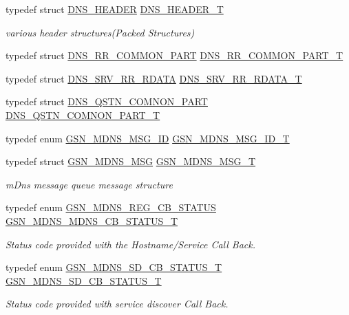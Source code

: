 \begin{DoxyCompactItemize}
\item 
typedef struct \hyperlink{a00013}{DNS\_\-HEADER} \hyperlink{a00668_gaf26129a48ef3757ef5060ba8bb457d9c}{DNS\_\-HEADER\_\-T}
\begin{DoxyCompactList}\small\item\em various header structures(Packed Structures) \end{DoxyCompactList}\item 
typedef struct \hyperlink{a00015}{DNS\_\-RR\_\-COMMON\_\-PART} \hyperlink{a00526_a7a61e300572a2dbc5c7694b9975e977f}{DNS\_\-RR\_\-COMMON\_\-PART\_\-T}
\item 
typedef struct \hyperlink{a00016}{DNS\_\-SRV\_\-RR\_\-RDATA} \hyperlink{a00526_a5a120225d78963b53675c5e27686c7ab}{DNS\_\-SRV\_\-RR\_\-RDATA\_\-T}
\item 
typedef struct \hyperlink{a00014}{DNS\_\-QSTN\_\-COMNON\_\-PART} \hyperlink{a00526_a8ac066089aff8c4b88aeb4dca6500e7d}{DNS\_\-QSTN\_\-COMNON\_\-PART\_\-T}
\item 
typedef enum \hyperlink{a00526_aea0edb0e612a2715e8e8b67018db1936}{GSN\_\-MDNS\_\-MSG\_\-ID} \hyperlink{a00526_a04683c3770745c022dfa21c6317456a9}{GSN\_\-MDNS\_\-MSG\_\-ID\_\-T}
\item 
typedef struct \hyperlink{a00145}{GSN\_\-MDNS\_\-MSG} \hyperlink{a00668_ga3216bbc2adc29e835ce14e76c1e80d44}{GSN\_\-MDNS\_\-MSG\_\-T}
\begin{DoxyCompactList}\small\item\em mDns message queue message structure \end{DoxyCompactList}\item 
typedef enum \hyperlink{a00668_ga4736a957266d4e3ba37c9d5ec86beec8}{GSN\_\-MDNS\_\-REG\_\-CB\_\-STATUS} \hyperlink{a00668_gab2cd71424a7a8f16216fe22eb24e31b3}{GSN\_\-MDNS\_\-MDNS\_\-CB\_\-STATUS\_\-T}
\begin{DoxyCompactList}\small\item\em Status code provided with the Hostname/Service Call Back. \end{DoxyCompactList}\item 
typedef enum \hyperlink{a00668_gaf68e291caa4e1bdf31169e000c41750b}{GSN\_\-MDNS\_\-SD\_\-CB\_\-STATUS\_\-T} \hyperlink{a00668_ga81d8695cbcffd3e0d102ef17d1981938}{GSN\_\-MDNS\_\-SD\_\-CB\_\-STATUS\_\-T}
\begin{DoxyCompactList}\small\item\em Status code provided with service discover Call Back. \end{DoxyCompactList}\item 

\end{DoxyCompactItemize}

